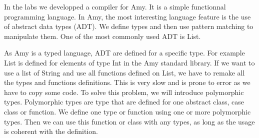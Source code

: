 In the labs we developped a compiler for Amy. It is a simple functionnal programming language. In Amy, the most interesting language feature is the use of abstract data types (ADT). We define types and then use pattern matching to manipulate them. One of the most commonly used ADT is List. 

As Amy is a typed language, ADT are defined for a specific type. For example List is defined for elements of type Int in the Amy standard library. If we want to use a list of String and use all functions defined on List, we have to remake all the types and functions definitions. This is very slow and is prone to error as we have to copy some code. To solve this problem, we will introduce polymorphic types. Polymorphic types are type that are defined for one abstract class, case class or function. We define one type or function using one or more polymorphic types. Then we can use this function or class with any types, as long as the usage is coherent with the definition.
